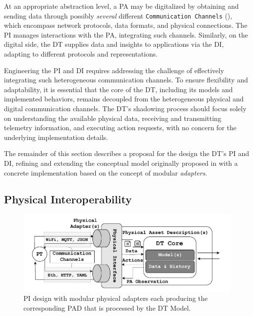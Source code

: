 At an appropriate abstraction level, a \ac{PA} may be digitalized by obtaining and sending data through possibly \emph{several} different \texttt{Communication Channels} (), which 
encompass network protocols, data formats, and physical connections.
The \ac{PI} manages interactions with the \ac{PA}, integrating such channels.
%
Similarly, on the digital side, the \ac{DT} supplies data and insights to applications via the \ac{DI}, adapting to different protocols and representations.

Engineering the \ac{PI} and \ac{DI} requires addressing the challenge of effectively integrating such heterogeneous communication channels.
%
To ensure flexibility and adaptability, it is essential that the core of the \ac{DT}, including its models and implemented behaviors, remains decoupled from the heterogeneous physical and digital communication channels.
%
The \ac{DT}'s shadowing process should focus solely on understanding the available physical data, receiving and transmitting telemetry information, and executing action requests, with no concern for the underlying implementation details.

The remainder of this section describes a proposal for the design the \ac{DT}'s \ac{PI} and \ac{DI}, refining and extending the conceptual model originally proposed in \cite{web-of-dt-ricci-2022} with a concrete implementation based on the concept of modular \emph{adapters}.

\subsection{Physical Interoperability}
\label{ssec:dte:dt-engineering:physical_interoperability}

\begin{figure}
    \centering
    \includegraphics[width=\columnwidth]{figures/dt-interoperability/dt_interoperability_physical.pdf}
    \caption{PI design with modular physical adapters each producing the corresponding \acl{PAD} that is processed by the \ac{DT} Model.}
    \label{fig:physical_interoperability}
\end{figure}


